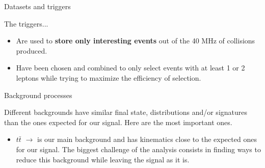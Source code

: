 \documentclass[handout,8 pt]{beamer}
\begin{document}
\begin{frame}{Datasets and triggers}
	\begin{exampleblock}{} The triggers... \end{exampleblock}
	\begin{itemize}
	\justifying
	\item Are used to \textbf{store only interesting events} out of the 40 MHz of collisions produced. \\ \vspace{8pt}
	\item Have been chosen and combined to only select events with at least 1 or 2 leptons while trying to maximize the efficiency of selection.
	\end{itemize} \vfill 
	
\end{frame}


\begin{frame}{Background processes}

	\justifying
	Different backgrounds have similar final state, distributions and/or signatures than the ones expected for our signal. Here are the most important ones. \vfill
	
	\begin{itemize}
	\justifying
	\item $t \bar t$ $\rightarrow$ is our main background and has kinematics close to the expected ones for our signal. The biggest challenge of the analysis consists in finding ways to reduce this background while leaving the signal as it is. \vspace{8pt} 
	

\end{itemize}
\end{frame}
\end{document}
